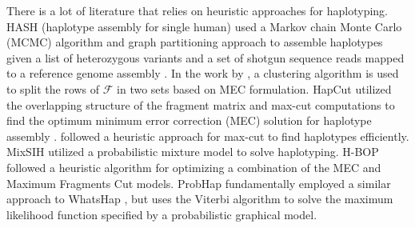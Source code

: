 There is a lot of literature that relies on heuristic approaches for haplotyping.
HASH (haplotype assembly for single human) used a Markov chain Monte Carlo (MCMC) algorithm and graph partitioning approach to assemble haplotypes 
given a list of heterozygous variants and a set of shotgun sequence reads mapped to a reference genome assembly \citep{bansal2008mcmc}. 
In the work by \cite{wang2007clustering}, a clustering algorithm is used to split the rows of $\mathcal{F}$ in two sets based on MEC formulation.
HapCut utilized the overlapping structure of the fragment matrix and max-cut computations to find the optimum minimum error correction (MEC) solution for haplotype assembly \citep{Bansal2008}. 
\cite{Duitama2010} followed a heuristic approach for max-cut to find haplotypes efficiently. 
MixSIH \citep{matsumoto2013mixsih} utilized a probabilistic mixture model to solve haplotyping.
H-BOP \citep{xie2012fast} followed a heuristic algorithm for optimizing a combination of the MEC and Maximum Fragments Cut models.
ProbHap \citep{Kuleshov2014b} fundamentally employed a similar approach to WhatsHap \citep{Patterson2015}, but uses the Viterbi algorithm to solve the maximum likelihood function specified by a probabilistic graphical model. 
